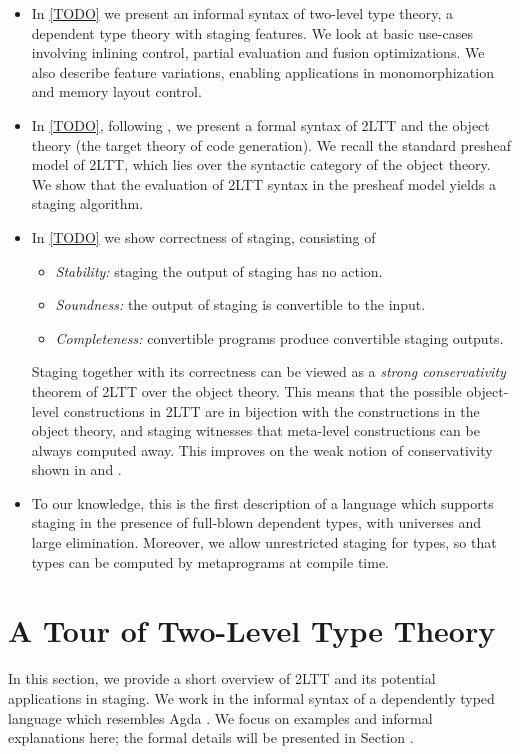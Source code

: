 \documentclass[acmsmall]{acmart}
\theoremstyle{remark}
\begin{document}
\begin{itemize}
  \item In \ref{TODO} we present an informal syntax of two-level type theory, a
    dependent type theory with staging features. We look at basic use-cases
    involving inlining control, partial evaluation and fusion optimizations. We
    also describe feature variations, enabling applications in monomorphization
    and memory layout control.
  \item In \ref{TODO}, following \cite{twolevel}, we present a formal syntax of
    2LTT and the object theory (the target theory of code generation). We recall
    the standard presheaf model of 2LTT, which lies over the syntactic category
    of the object theory. We show that the evaluation of 2LTT syntax in the presheaf
    model yields a staging algorithm.
  \item In \ref{TODO} we show correctness of staging, consisting of
    \begin{itemize}
    \item \emph{Stability:} staging the output of staging has no action.
    \item \emph{Soundness:} the output of staging is convertible to the input.
    \item \emph{Completeness:} convertible programs produce convertible staging outputs.
    \end{itemize}
    Staging together with its correctness can be viewed as a \emph{strong
    conservativity} theorem of 2LTT over the object theory. This means that the
    possible object-level constructions in 2LTT are in bijection with the
    constructions in the object theory, and staging witnesses that meta-level
    constructions can be always computed away. This improves on the weak notion
    of conservativity shown in \cite{capriotti2017models} and
    \cite{twolevel}.
  \item To our knowledge, this is the first description of a language which
    supports staging in the presence of full-blown dependent types, with
    universes and large elimination. Moreover, we allow unrestricted staging
    for types, so that types can be computed by metaprograms at compile time.
\end{itemize}

\section{A Tour of Two-Level Type Theory}

In this section, we provide a short overview of 2LTT and its potential
applications in staging. We work in the informal syntax of a dependently typed
language which resembles Agda \cite{TODO}. We focus on examples and informal
explanations here; the formal details will be presented in Section \cite{TODO}.
\end{document}
